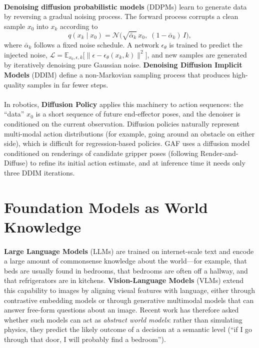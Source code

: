 \documentclass[12pt,a4paper,final]{extreport}
\begin{document}
\paragraph{} \textbf{Denoising diffusion probabilistic models} (DDPMs) learn to generate data by reversing a gradual noising process. The forward process corrupts a clean sample $x_0$ into $x_k$ according to
\begin{equation}
q(x_k\mid x_0)=\mathcal{N}\big(\sqrt{\bar{\alpha}_k}\,x_0,\;(1-\bar{\alpha}_k)\,I\big),
\end{equation}
where $\bar{\alpha}_k$ follows a fixed noise schedule. A network $\epsilon_\theta$ is trained to predict the injected noise, $\mathcal{L}=\mathbb{E}_{x_0,\epsilon,k}\big[\|\epsilon-\epsilon_\theta(x_k,k)\|^2\big]$, and new samples are generated by iteratively denoising pure Gaussian noise. \textbf{Denoising Diffusion Implicit Models} (DDIM) define a non-Markovian sampling process that produces high-quality samples in far fewer steps.

\paragraph{} In robotics, \textbf{Diffusion Policy} applies this machinery to action sequences: the ``data'' $x_0$ is a short sequence of future end-effector poses, and the denoiser is conditioned on the current observation. Diffusion policies naturally represent multi-modal action distributions (for example, going around an obstacle on either side), which is difficult for regression-based policies. GAF uses a diffusion model conditioned on renderings of candidate gripper poses (following Render-and-Diffuse) to refine its initial action estimate, and at inference time it needs only three DDIM iterations.

\section{Foundation Models as World Knowledge}

\paragraph{} \textbf{Large Language Models} (LLMs) are trained on internet-scale text and encode a large amount of commonsense knowledge about the world---for example, that beds are usually found in bedrooms, that bedrooms are often off a hallway, and that refrigerators are in kitchens. \textbf{Vision-Language Models} (VLMs) extend this capability to images by aligning visual features with language, either through contrastive embedding models or through generative multimodal models that can answer free-form questions about an image. Recent work has therefore asked whether such models can act as \emph{abstract world models}: rather than simulating physics, they predict the likely outcome of a decision at a semantic level (``if I go through that door, I will probably find a bedroom'').
\end{document}
